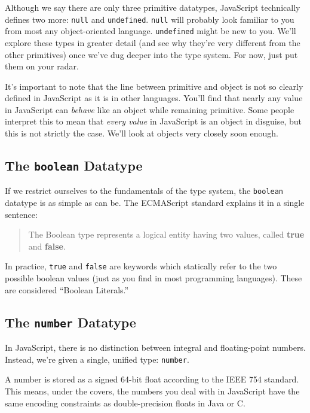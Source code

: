 \documentclass[11pt,letter]{book}
\begin{document}
    Although we say there are only three primitive datatypes, JavaScript technically defines two 
    more: \texttt{null} and \texttt{undefined}. \texttt{null} will probably look familiar to you 
    from most any object-oriented language. \texttt{undefined} might be new to you. We'll explore 
    these types in greater detail (and see why they're very different from the other primitives) 
    once we've dug deeper into the type system. For now, just put them on your radar.
    
    It's important to note that the line between primitive and object is not so clearly defined
    in JavaScript as it is in other languages. You'll find that nearly any value in JavaScript can
    \emph{behave} like an object while remaining primitive. Some people interpret this to mean that
    \emph{every value} in JavaScript is an object in disguise, but this is not strictly the case.
    We'll look at objects very closely soon enough.
    
    \subsection{The \texttt{boolean} Datatype}
    If we restrict ourselves to the fundamentals of the type system, the \texttt{boolean} 
    datatype is as simple as can be. The ECMAScript standard explains it in a single sentence:
    
    \begin{quote}
        The Boolean type represents a logical entity having two values, called \textbf{true}
        and \textbf{false}.
    \end{quote}
    
    In practice, \texttt{true} and \texttt{false} are keywords which  statically refer to the two 
    possible boolean values (just as you find in most programming languages). These are considered 
    ``Boolean Literals.''
    
    \subsection{The \texttt{number} Datatype}
    In JavaScript, there is no distinction between integral and floating-point numbers. Instead, 
    we're given a single, unified type: \texttt{number}.
    
    A number is stored as a signed 64-bit float according to the IEEE 754 standard. This means, 
    under the covers, the numbers you deal with in JavaScript have the same encoding constraints as 
    double-precision floats in Java or C.
    
\end{document}
